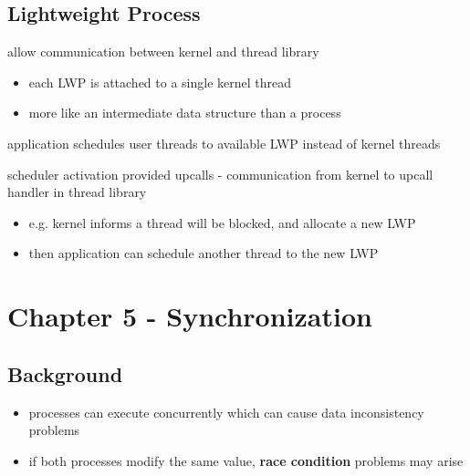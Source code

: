 \documentclass[11pt]{article}
\begin{document}
\subsection{Lightweight Process}
\label{sec:orge4a7cef}
\begin{description}
\item[{lightweight process}] allow communication between kernel and thread library
\begin{itemize}
\item each LWP is attached to a single kernel thread
\item more like an intermediate data structure than a process
\end{itemize}
\item application schedules user threads to available LWP instead of kernel threads
\item scheduler activation provided upcalls - communication from kernel to upcall handler in thread library
\begin{itemize}
\item e.g. kernel informs a thread will be blocked, and allocate a new LWP
\item then application can schedule another thread to the new LWP
\end{itemize}
\end{description}
\section{Chapter 5 - Synchronization}
\label{sec:org1bfa190}
\subsection{Background}
\label{sec:org6de80b4}
\begin{itemize}
\item processes can execute concurrently which can cause data inconsistency problems
\item if both processes modify the same value, \textbf{race condition} problems may arise
\end{itemize}
\end{document}
